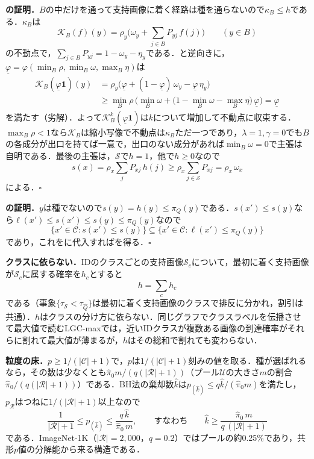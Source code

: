 \appblock
\textbf{\TCapture{}の証明．}$B$の中だけを通って支持画像に着く経路は種を通らないので$\kappa_B\le h$である．$\kappa_B$は
\begin{equation*}
\mathcal{K}_B(f)(y)=\rho_y\Big(\omega_y+\sum_{j\in B}P_{yj}\,f(j)\Big)\qquad(y\in B)
\end{equation*}
の不動点で，$\sum_{j\in B}P_{yj}=1-\omega_y-\eta_y$である．\TEscape{}と逆向きに，$\underline\varphi=\varphi(\min_B\rho,\min_B\omega,\max_B\eta)$は
\begin{align*}
\mathcal{K}_B(\underline\varphi\mathbf{1})(y)
&=\rho_y\big(\underline\varphi+(1-\underline\varphi)\,\omega_y-\underline\varphi\,\eta_y\big)\\
&\ge\min_B\rho\,\Big(\min_B\omega+\big(1-\min_B\omega-\max_B\eta\big)\,\underline\varphi\Big)=\underline\varphi
\end{align*}
を満たす（劣解）．よって$\mathcal{K}_B^k(\underline\varphi\mathbf{1})$は$k$について増加して不動点に収束する．$\max_B\rho<1$なら$\mathcal{K}_B$は縮小写像で不動点は$\kappa_B$ただ一つであり，$\lambda{=}1,\gamma{=}0$でも$B$の各成分が出口を持てば一意で，出口のない成分があれば$\min_B\omega=0$で主張は自明である．最後の主張は，$\mathcal{S}$で$h=1$，他で$h\ge0$なので
\begin{equation*}
s(x)=\rho_x\sum_jP_{xj}\,h(j)\ge\rho_x\sum_{j\in\mathcal{S}}P_{xj}=\rho_x\,\omega_x
\end{equation*}
による．$\square$

\appblock
\textbf{\CSep{}の証明．}$y$は種でないので$s(y)=h(y)\le\pi_Q(y)$である．$s(x')\le s(y)$なら$\ell(x')\le s(x')\le s(y)\le\pi_Q(y)$なので
\begin{equation*}
\{x'\in\mathcal{C}:s(x')\le s(y)\}\subseteq\{x'\in\mathcal{C}:\ell(x')\le\pi_Q(y)\}
\end{equation*}
であり，これをに代入すればを得る．$\square$

\appblock
\textbf{クラスに依らない．}IDのクラスごとの支持画像$\mathcal{S}_c$について，最初に着く支持画像が$\mathcal{S}_c$に属する確率を$h_c$とすると
\begin{equation*}
h=\sum_ch_c
\end{equation*}
である（事象$\{\tau_{\mathcal{S}}<\tau_{\hat{Q}}\}$は最初に着く支持画像のクラスで排反に分かれ，割引は共通）．$h$はクラスの分け方に依らない．同じグラフでクラスラベルを伝播させて最大値で読むLGC-maxでは，近いIDクラスが複数ある画像の到達確率がそれらに割れて最大値が薄まるが，$h$はその総和で割れても変わらない．

\appblock
\textbf{粒度の床．}$p\ge1/(|\mathcal{C}|+1)$で，$p$は$1/(|\mathcal{C}|+1)$刻みの値を取る．種が選ばれるなら，その数は少なくとも$\hat\pi_0m/(q(|\mathcal{R}|+1))$（プール$\mathcal{U}$の大きさ$m$の割合$\hat\pi_0/(q(|\mathcal{R}|+1))$）である．BH法の棄却数$\hat k$は$p_{(\hat k)}\le q\hat k/(\hat\pi_0m)$を満たし，$p_{\mathcal{R}}$はつねに$1/(|\mathcal{R}|+1)$以上なので
\begin{equation*}
\frac{1}{|\mathcal{R}|+1}\le p_{(\hat k)}\le\frac{q\,\hat k}{\hat\pi_0\,m},
\qquad\text{すなわち}\qquad
\hat k\ge\frac{\hat\pi_0\,m}{q\,(|\mathcal{R}|+1)}
\end{equation*}
である．ImageNet-1K（$|\mathcal{R}|{=}2{,}000$，$q{=}0.2$）ではプールの約0.25\%であり，共形$p$値の分解能から来る構造である．
